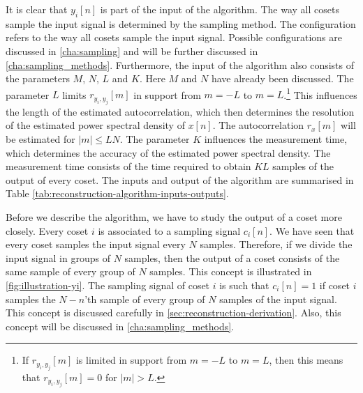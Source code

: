 \documentclass[a4paper, openany, oneside]{memoir}
\begin{document}
It is clear that $y_i[n]$ is part of the input of the algorithm. The way all cosets sample the input signal is determined by the sampling method. The configuration refers to the way all cosets sample the input signal. Possible configurations are discussed in \cref{cha:sampling} and will be further discussed in \cref{cha:sampling_methods}. Furthermore, the input of the algorithm also consists of the parameters $M$, $N$, $L$ and $K$. Here $M$ and $N$ have already been discussed. The parameter $L$ limits $r_{y_i,y_j}[m]$ in support from $m=-L$ to $m=L$.\footnote{If $r_{y_i,y_j}[m]$ is limited in support from $m=-L$ to $m=L$, then this means that $r_{y_i,y_j}[m]=0$ for $|m|>L$.} This influences the length of the estimated autocorrelation, which then determines the resolution of the estimated power spectral density of $x[n]$. The autocorrelation $r_x[m]$ will be estimated for $|m| \le LN$. The parameter $K$ influences the measurement time, which determines the accuracy of the estimated power spectral density. The measurement time consists of the time required to obtain $KL$ samples of the output of every coset. The inputs and output of the algorithm are summarised in Table \ref{tab:reconstruction-algorithm-inputs-outputs}.

Before we describe the algorithm, we have to study the output of a coset more closely. Every coset $i$ is associated to a sampling signal $c_i[n]$. We have seen that every coset samples the input signal every $N$ samples. Therefore, if we divide the input signal in groups of $N$ samples, then the output of a coset consists of the same sample of every group of $N$ samples. This concept is illustrated in \cref{fig:illustration-yi}. The sampling signal of coset $i$ is such that $c_i[n]=1$ if coset $i$ samples the $N-n$'th sample of every group of $N$ samples of the input signal. This concept is discussed carefully in \cref{sec:reconstruction-derivation}. Also, this concept will be discussed in \cref{cha:sampling_methods}.
\end{document}
